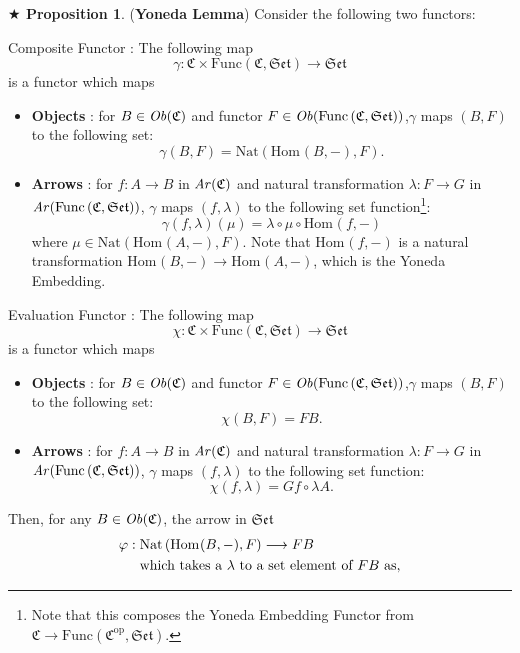 \documentclass{article}
\theoremstyle{definition}
\theoremstyle{remark}
\theoremstyle{definition}
\theoremstyle{definition}
\newtheorem{proposition}{$\bigstar$ Proposition}
\theoremstyle{definition}
\newcommand{\cat}[1]{\mathfrak{#1}}
\newcommand{\opcat}[1]{\mathfrak{#1}^{\text{op}}}
\newcommand{\obj}[1]{\text{\textit{Ob}}(#1)}
\newcommand{\arr}[1]{\text{\textit{Ar}}(#1)}
\newcommand{\homset}[3]{\text{Hom}_{#1}(#2,#3)}
\newcommand{\Func}[2]{\text{Func}\left (#1,#2\right )}
\newcommand{\Nat}[2]{\text{Nat}\left (#1,#2\right )}
\begin{document}
 \begin{proposition}\label{P-2}
 	(\textbf{Yoneda Lemma}) Consider the following two functors:
 	\begin{enumerate}
 		\item {Composite Functor : The following map
 			\[\gamma : \cat{C} \times \Func{\cat{C}}{\cat{Set}} \longrightarrow \cat{Set}\]
 			is a functor which maps 
 			\begin{itemize}
 				\item {\textbf{Objects} : for $ B \in \obj{\cat{C}} $ and functor $ F \in \obj{\Func{\cat{C}}{\cat{Set}}} $,$\gamma$ maps $ (B,F) $ to the following set:
 			\[\gamma (B,F) = \Nat{\homset{}{B}{-}}{F}.\]	
 			}
 		\item {\textbf{Arrows} : for $ f : A\to B $ in $ \arr{\cat{C}} $ and natural transformation $ \lambda : F \to G $ in $ \arr{\Func{\cat{C}}{\cat{Set}}}$, $ \gamma $ maps $ (f,\lambda) $ to the following set function\footnote{Note that this composes the Yoneda Embedding Functor from $ \cat{C} \to \Func{\opcat{C}}{\cat{Set}}$.}:
 	\[\gamma(f,\lambda) (\mu) = \lambda \circ \mu \circ \homset{}{f}{-} \]
 	where $ \mu \in \Nat{\homset{}{A}{-}}{F}$.	Note that $ \homset{}{f}{-} $ is a natural transformation $ \homset{}{B}{-} \longrightarrow  \homset{}{A}{-}$, which is the Yoneda Embedding.
 	}
 			\end{itemize}
 		\item {Evaluation Functor : The following map
 	\[\chi: \cat{C} \times \Func{\cat{C}}{\cat{Set}} \longrightarrow \cat{Set}\]	
 	is a functor which maps
 	\begin{itemize}
 		\item {\textbf{Objects} : for $ B \in \obj{\cat{C}} $ and functor $ F \in \obj{\Func{\cat{C}}{\cat{Set}}} $,$\gamma$ maps $ (B,F) $ to the following set:
 	\[\chi(B,F) = FB.\]	
 	}
	\item {\textbf{Arrows} : for $ f : A\to B $ in $ \arr{\cat{C}} $ and natural transformation $ \lambda : F \to G $ in $ \arr{\Func{\cat{C}}{\cat{Set}}}$, $ \gamma $ maps $ (f,\lambda) $ to the following set function:
\[\chi(f,\lambda) = Gf\circ \lambda A.\]	
 }
 	\end{itemize}
 	}
 	}
 	\end{enumerate}
 Then, for any $ B\in \obj{\cat{C}} $, the arrow in $ \cat{Set} $
 \begin{equation}\label{Eq-1}
 	\begin{split}
 		\varphi :\; &\Nat{\homset{}{B}{-}}{F} \longrightarrow FB\\
 		&\text{which takes a } \lambda \text{ to a set element of $ FB $ as},\\

\end{split}
\end{equation}
\end{proposition}
\end{document}
